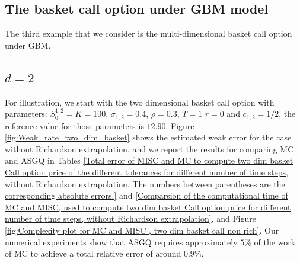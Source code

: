 %
%


\subsection{The basket call option  under GBM  model}\label{sec:The basket call option  under GBM  model}
The third example that we consider  is the multi-dimensional  basket call option under GBM. 
\subsection{$d=2$}
For illustration, we start with the two dimensional basket call option  with parameters:  $S_0^{1,2}=K=100$, $\sigma_{1,2}=0.4$, $\rho=0.3$, $T=1$ $r=0$ and $c_{1,2}=1/2$, the reference value for those parameters  is  $12.90$. Figure \ref{fig:Weak_rate_two_dim_basket} shows the estimated   weak error  for the case without Richardson extrapolation, and we report the results for comparing MC and ASGQ in Tables \ref{Total error of MISC and MC to compute two  dim basket  Call option price of the different tolerances for different number of time steps, without Richardson extrapolation. The numbers between parentheses are the corresponding absolute errors.} and \ref{Comparsion of the computational time of  MC and MISC, used to compute two dim basket Call option price  for different number of time steps, without Richardson extrapolation}, and Figure \ref{fig:Complexity plot for MC and MISC , two dim basket call non rich}. Our numerical experiments show that ASGQ  requires approximately $5\%$ of the work of MC  to achieve a total relative error of around $0.9\%$.

